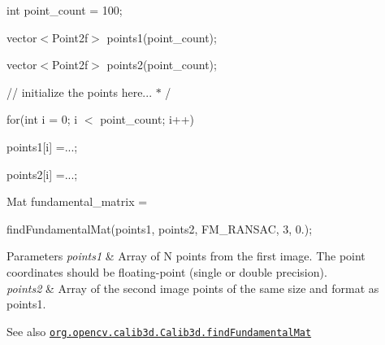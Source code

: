 {\ttfamily }

{\ttfamily }

{\ttfamily int point\+\_\+count = 100;}

{\ttfamily }

{\ttfamily }

{\ttfamily vector$<$\+Point2f$>$ points1(point\+\_\+count);}

{\ttfamily }

{\ttfamily }

{\ttfamily vector$<$\+Point2f$>$ points2(point\+\_\+count);}

{\ttfamily }

{\ttfamily }

{\ttfamily // initialize the points here... $\ast$ /}

{\ttfamily }

{\ttfamily }

{\ttfamily for(int i = 0; i $<$ point\+\_\+count; i++)}

{\ttfamily }

{\ttfamily }

{\ttfamily points1\mbox{[}i\mbox{]} =...;}

{\ttfamily }

{\ttfamily }

{\ttfamily points2\mbox{[}i\mbox{]} =...;}

{\ttfamily }

{\ttfamily }

{\ttfamily Mat fundamental\+\_\+matrix =}

{\ttfamily }

{\ttfamily }

{\ttfamily find\+Fundamental\+Mat(points1, points2, F\+M\+\_\+\+R\+A\+N\+S\+AC, 3, 0.);}

{\ttfamily }

{\ttfamily 
\begin{DoxyParams}{Parameters}
{\em points1} & Array of {\ttfamily N} points from the first image. The point coordinates should be floating-\/point (single or double precision). \\
\hline
{\em points2} & Array of the second image points of the same size and format as {\ttfamily points1}.\\
\hline
\end{DoxyParams}
\begin{DoxySeeAlso}{See also}
\href{http://docs.opencv.org/modules/calib3d/doc/camera_calibration_and_3d_reconstruction.html#findfundamentalmat}{\tt org.\+opencv.\+calib3d.\+Calib3d.\+find\+Fundamental\+Mat} 
\end{DoxySeeAlso}
}\mbox{\label{classorg_1_1opencv_1_1calib3d_1_1_calib3d_a2c32d44d2f35dc41aa09d54eb6829ab8}} 
